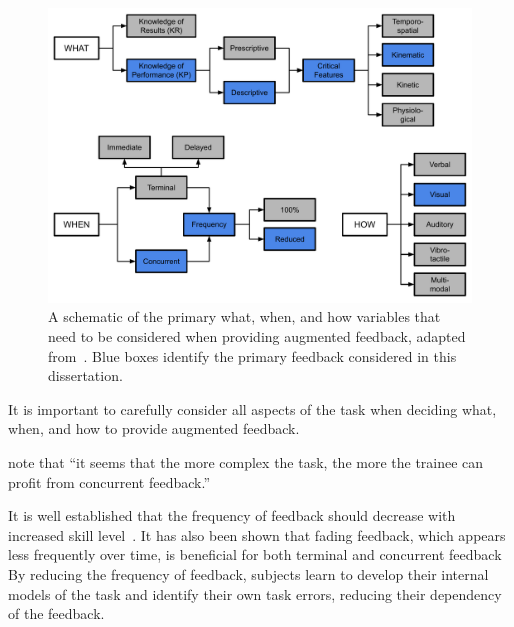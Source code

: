 \begin{figure}[tb]
    \begin{center}
        \includegraphics[width=\linewidth]{figures/Introduction/feedbackschematichighlighted.pdf}
        \caption[A schematic of the primary what, when, and how variables that need to be considered when providing augmented feedback]{A schematic of the primary what, when, and how variables that need to be considered when providing augmented feedback, adapted from~\citep{hodges2020skill}. Blue boxes identify the primary feedback considered in this dissertation.}
        \label{figure:afvariables}
    \end{center}
\end{figure}

It is important to carefully consider all aspects of the task when deciding what, when, and how to provide augmented feedback.

\citeauthor{sigrist_augmented_2013} note that ``it seems that the more complex the task, the more the trainee can profit from concurrent feedback.''

It is well established that the frequency of feedback should decrease with increased skill level~\citep{doi:10.3200/JMBR.36.2.212-224, timmermans_technology-assisted_2009, Wulf2002, doi:10.1080/00222899809601335}.
It has also been shown that fading feedback, which appears less frequently over time, is beneficial for both terminal and concurrent feedback~\citep{CROWELL201178, KOVACS2011311}
By reducing the frequency of feedback, subjects learn to develop their internal models of the task and identify their own task errors, reducing their dependency of the feedback.

